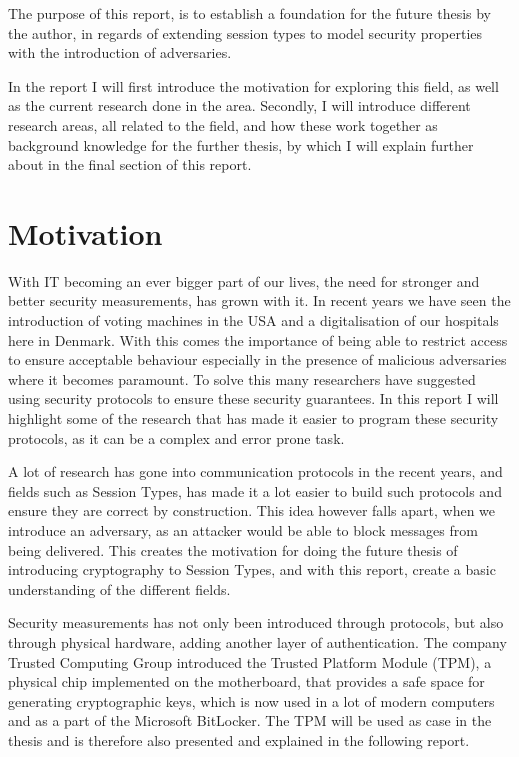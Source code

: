 \label{chap:Introduction}
The purpose of this report, is to establish a foundation for the future thesis by the author, in regards of extending session types to model security properties with the introduction of adversaries.

In the report I will first introduce the motivation for exploring this field, as well as the current research done in the area. Secondly, I will introduce different research areas, all related to the field, and how these work together as background knowledge for the further thesis, by which I will explain further about in the final section of this report. 

\section{Motivation}
With IT becoming an ever bigger part of our lives, the need for stronger and better security measurements, has grown with it. In recent years we have seen the introduction of voting machines in the USA and a digitalisation of our hospitals here in Denmark. With this comes the importance of being able to restrict access to ensure acceptable behaviour especially in the presence of malicious adversaries where it becomes paramount. To solve this many researchers have suggested using security protocols to ensure these security guarantees. In this report I will highlight some of the research that has made it easier to program these security protocols, as it can be a complex and error prone task. 

A lot of research has gone into communication protocols in the recent years, and fields such as Session Types, has made it a lot easier to build such protocols and ensure they are correct by construction. This idea however falls apart, when we introduce an adversary, as an attacker would be able to block messages from being delivered. This creates the motivation for doing the future thesis of introducing cryptography to Session Types, and with this report, create a basic understanding of the different fields. 

Security measurements has not only been introduced through protocols, but also through physical hardware, adding another layer of authentication. The company Trusted Computing Group introduced the Trusted Platform Module (TPM), a physical chip implemented on the motherboard, that provides a safe space for generating cryptographic keys, which is now used in a lot of modern computers and as a part of the Microsoft BitLocker. The TPM will be used as case in the thesis and is therefore also presented and explained in the following report. 

